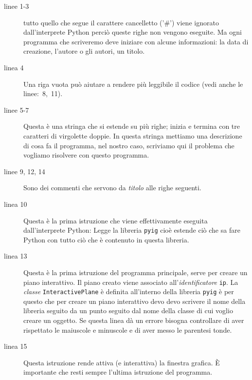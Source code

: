 \begin{description}
 \item [linee 1-3] 
 tutto quello che segue il carattere cancelletto ('\#') viene ignorato 
dall'interprete Python perciò queste righe non vengono eseguite. Ma ogni 
programma che scriveremo deve iniziare con alcune informazioni: 
la data di creazione, l'autore o gli autori, un titolo.
 \item [linea 4]
 Una riga vuota può aiutare a rendere più leggibile il codice (vedi anche le 
linee:~8,~11).
 \item [linee 5-7]
 Questa è una stringa che si estende su più righe; inizia e termina con tre 
caratteri di virgolette doppie. In questa stringa mettiamo una descrizione di 
cosa fa il programma, nel nostro caso, scriviamo qui il problema che vogliamo 
risolvere con questo programma.
 \item [linee 9, 12, 14]
 Sono dei commenti che servono da \emph{titolo} alle righe seguenti.
 \item [linea 10]
 Questa è la prima istruzione che viene effettivamente eseguita 
dall'interprete Python: Legge la libreria \lstinline{pyig} cioè estende ciò 
che sa fare Python con tutto ciò che è contenuto in questa libreria. 
 \item [linea 13]
 Questa è la prima istruzione del programma principale, serve per creare un 
piano interattivo. Il piano creato viene associato all'\emph{identificatore}
\lstinline{ip}. La \emph{classe} \lstinline{InteractivePlane} è definita 
all'interno della libreria \lstinline{pyig} è per questo che per creare un 
piano interattivo devo devo scrivere il nome della libreria seguito da un punto 
seguito dal nome della classe di cui voglio creare un oggetto. Se 
questa linea dà un errore bisogna controllare di aver rispettato le maiuscole e 
minuscole e di aver messo le parentesi tonde. 
 \item [linea 15]
 Questa istruzione rende attiva (e interattiva) la finestra grafica. È 
importante che resti sempre l'ultima istruzione del programma.
\end{description}

